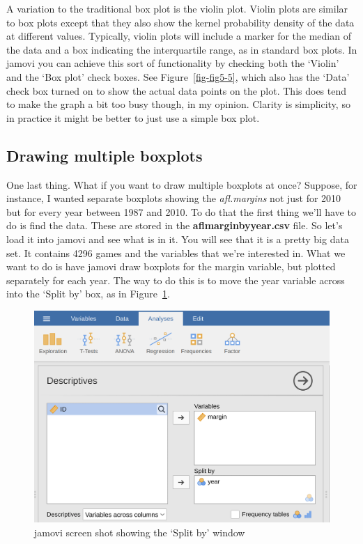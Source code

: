\documentclass[
  a4paper,
]{book}
\begin{document}
A variation to the traditional box plot is the violin plot. Violin plots
are similar to box plots except that they also show the kernel
probability density of the data at different values. Typically, violin
plots will include a marker for the median of the data and a box
indicating the interquartile range, as in standard box plots. In jamovi
you can achieve this sort of functionality by checking both the `Violin'
and the `Box plot' check boxes. See Figure~\ref{fig-fig5-5}, which also
has the `Data' check box turned on to show the actual data points on the
plot. This does tend to make the graph a bit too busy though, in my
opinion. Clarity is simplicity, so in practice it might be better to
just use a simple box plot.

\hypertarget{drawing-multiple-boxplots}{%
\subsection{Drawing multiple boxplots}\label{drawing-multiple-boxplots}}

One last thing. What if you want to draw multiple boxplots at once?
Suppose, for instance, I wanted separate boxplots showing the
\emph{afl.margins} not just for 2010 but for every year between 1987 and
2010. To do that the first thing we'll have to do is find the data.
These are stored in the \textbf{aflmarginbyyear.csv} file. So let's load
it into jamovi and see what is in it. You will see that it is a pretty
big data set. It contains 4296 games and the variables that we're
interested in. What we want to do is have jamovi draw boxplots for the
margin variable, but plotted separately for each year. The way to do
this is to move the year variable across into the `Split by' box, as in
Figure~\ref{fig-fig5-6}.

\begin{figure}

\includegraphics[width=1\textwidth,height=\textheight]{images/fig5-6.png} \hfill{}

\caption{\label{fig-fig5-6}jamovi screen shot showing the `Split by'
window}

\end{figure}
\end{document}
